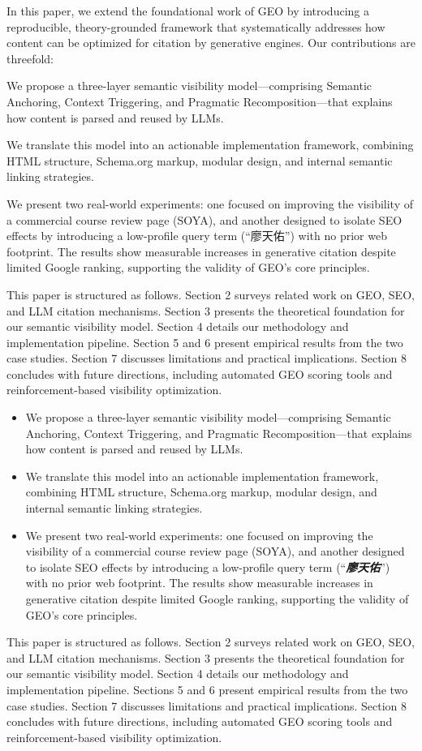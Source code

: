 In this paper, we extend the foundational work of GEO by introducing a reproducible, theory-grounded framework that systematically addresses how content can be optimized for citation by generative engines. Our contributions are threefold:

We propose a three-layer semantic visibility model—comprising Semantic Anchoring, Context Triggering, and Pragmatic Recomposition—that explains how content is parsed and reused by LLMs.

We translate this model into an actionable implementation framework, combining HTML structure, Schema.org markup, modular design, and internal semantic linking strategies.

We present two real-world experiments: one focused on improving the visibility of a commercial course review page (SOYA), and another designed to isolate SEO effects by introducing a low-profile query term (“廖天佑”) with no prior web footprint. The results show measurable increases in generative citation despite limited Google ranking, supporting the validity of GEO’s core principles.

This paper is structured as follows. Section 2 surveys related work on GEO, SEO, and LLM citation mechanisms. Section 3 presents the theoretical foundation for our semantic visibility model. Section 4 details our methodology and implementation pipeline. Section 5 and 6 present empirical results from the two case studies. Section 7 discusses limitations and practical implications. Section 8 concludes with future directions, including automated GEO scoring tools and reinforcement-based visibility optimization.
\begin{itemize}
  \item We propose a three-layer semantic visibility model---comprising Semantic Anchoring, Context Triggering, and Pragmatic Recomposition---that explains how content is parsed and reused by LLMs.
  \item We translate this model into an actionable implementation framework, combining HTML structure, Schema.org markup, modular design, and internal semantic linking strategies.
  \item We present two real-world experiments: one focused on improving the visibility of a commercial course review page (SOYA), and another designed to isolate SEO effects by introducing a low-profile query term (``\textit{\textbf{廖天佑}}'') with no prior web footprint. The results show measurable increases in generative citation despite limited Google ranking, supporting the validity of GEO's core principles.
\end{itemize}

This paper is structured as follows. Section 2 surveys related work on GEO, SEO, and LLM citation mechanisms. Section 3 presents the theoretical foundation for our semantic visibility model. Section 4 details our methodology and implementation pipeline. Sections 5 and 6 present empirical results from the two case studies. Section 7 discusses limitations and practical implications. Section 8 concludes with future directions, including automated GEO scoring tools and reinforcement-based visibility optimization.
